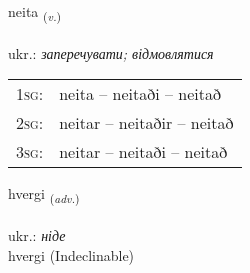 \documentclass[frontgrid, backgrid]{flacards}\usepackage[]{graphicx}\usepackage[]{xcolor}
\begin{document}
\renewcommand{\flhead}{\vskip5pt \fboxsep=0pt {\small\bfseries\footnotesize Sagnorð | дієслово}}
\renewcommand{\fcfoot}{\vskip5pt \fboxsep=0pt \hspace{2pt}{\small\bfseries\footnotesize 2K}}

\renewcommand{\blhead}{\vskip5pt {\small\bfseries\footnotesize Sagnorð | дієслово }}
\renewcommand{\bcfoot}{\vskip5pt \hspace{2pt}{\small\bfseries\footnotesize 2K}}


{neita \small{\textsubscript{(\textit{v.})}} \\[1ex] %
\textphonetic{[neiːta]} \\
ukr.: \emph{заперечувати; відмовлятися} \\  [2ex]
\renewcommand*{\arraystretch}{0.8}
\begin{tabular}{p{1cm}l}
\textsc{1sg}: & neita -- neitaði -- neitað \\ 
\textsc{2sg}: & neitar -- neitaðir -- neitað \\ 
\textsc{3sg}: & neitar -- neitaði -- neitað \\ 
\end{tabular}
}


\renewcommand{\flhead}{\vskip5pt \fboxsep=0pt {\small\bfseries\footnotesize Atviksorð | прислівник}}
\renewcommand{\fcfoot}{\vskip5pt \fboxsep=0pt \hspace{2pt}{\small\bfseries\footnotesize 2K}}

\renewcommand{\blhead}{\vskip5pt {\small\bfseries\footnotesize Atviksorð | прислівник }}
\renewcommand{\bcfoot}{\vskip5pt \hspace{2pt}{\small\bfseries\footnotesize 2K}}


{hvergi \small{\textsubscript{(\textit{adv.})}} \\[1ex]
\textphonetic{[kʰvɛrcɪ]} \\
ukr.: \emph{ніде} \\  [2ex]
hvergi (Indeclinable)}
\end{document}
